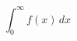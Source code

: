 \documentclass{article}
\begin{document}
\begin{equation}
\int_0^\infty f(x)\,dx
\end{equation}
\end{document}
